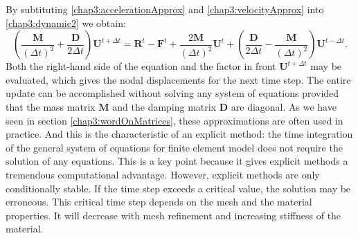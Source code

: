 By subtituting \eqref{chap3:accelerationApprox} and \eqref{chap3:velocityApprox} into \eqref{chap3:dynamic2} we obtain:
\begin{equation}
\left( \dfrac{\mathbf{M}}{(\Delta t)^2} + \dfrac{\mathbf{D}}{2 \Delta t} \right) \mathbf{U}^{t+\Delta t} = \mathbf{R}^t - \mathbf{F}^t + \dfrac{2 \mathbf{M}}{(\Delta t)^2} \mathbf{U}^t + \left( \dfrac{\mathbf{D}}{2 \Delta t} - \dfrac{\mathbf{M}}{(\Delta t)^2} \right) \mathbf{U}^{t-\Delta t}.
\end{equation}
Both the right-hand side of the equation and the factor in front $ \mathbf{U}^{t+\Delta t} $ may be evaluated, which gives the nodal displacements for the next time step. The entire update can be accomplished without solving any system of equations provided that the mass matrix $ \mathbf{M} $ and the damping matrix $ \mathbf{D} $ are diagonal. As we have seen in section \ref{chap3:wordOnMatrices}, these approximations are often used in practice. And this is the characteristic of an explicit method: the time integration of the general system of equations for finite element model does not require the solution of any equations. This is a key point because it gives explicit methods a tremendous computational advantage. However, explicit methods are only conditionally stable. If the time step exceeds a critical value, the solution may be erroneous. This critical time step depends on the mesh and the material properties. It will decrease with mesh refinement and increasing stiffness of the material. 


